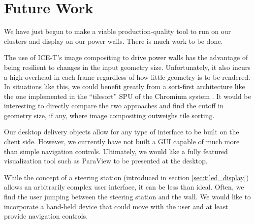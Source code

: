 \documentclass[twocolumn]{article}
\begin{document}
\section{Future Work}
\label{sec:future_work}

We have just begun to make a viable production-quality tool to run on our
clusters and display on our power walls.  There is much work to be done.

The use of ICE-T's image compositing to drive power walls has the advantage
of being resilient to changes in the input geometry size.  Unfortunately,
it also incurs a high overhead in each frame regardless of how little
geometry is to be rendered.  In situations like this, we could benefit
greatly from a sort-first architecture like the one implemented in the
``tilesort'' SPU of the Chromium system \cite{Humphreys02}.  It would be
interesting to directly compare the two approaches and find the cutoff in
geometry size, if any, where image compositing outweighs tile sorting.

Our desktop delivery objects allow for any type of interface to be built on
the client side.  However, we currently have not built a GUI capable of
much more than simple navigation controls.  Ultimately, we would like a
fully featured visualization tool such as ParaView \cite{Law01} to be
presented at the desktop.

While the concept of a steering station (introduced in section
\ref{sec:tiled_display}) allows an arbitrarily complex user interface, it
can be less than ideal.  Often, we find the user jumping between the
steering station and the wall.  We would like to incorporate a hand-held
device that could move with the user and at least provide navigation
controls.




\end{document}
